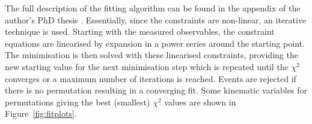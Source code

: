 
The full description of the fitting algorithm can be found in the appendix of the \HitFit author's PhD thesis
\autocite{Snyder}. Essentially, since the constraints are non-linear, an iterative technique is used. Starting with the
measured observables, the constraint equations are linearised by expansion in a power series around the starting point.
The minimisation is then solved with these linearised constraints, providing the new starting value for the next
minimisation step which is repeated until the $\chi^2$ converges or a maximum number of iterations is reached. Events
are rejected if there is no permutation resulting in a converging fit. Some kinematic variables for permutations giving
the best (smallest) $\chi^2$ values are shown in Figure~\ref{fig:fitplots}.

